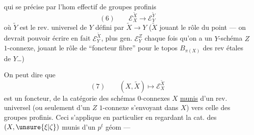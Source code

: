 
qui se précise par l'hom effectif de groupes profinis
\[
(6)\qquad \mathcal E_X^{\widetilde X}\longrightarrow\mathcal E_Y^{\widetilde Y}
\]
où $\widetilde Y$ est le rev. universel de $Y$ défini par $\widetilde X\longrightarrow Y$ ($\widetilde X$ jouant le rôle du point --- on devrait pouvoir écrire en fait $\mathcal E_Y^{\widetilde X}$, plus gen. $\mathcal E_Y^Z$ chaque fois qu'on a un $Y$-schéma $Z$ $1$-connexe, jouant le rôle de ``foncteur fibre'' pour le topos $B_{\pi(X)}$ des rev étales de $Y$\ldots)


On peut dire que
\[
(7)\qquad (X,\widetilde X)\longmapsto\mathcal E_X^{\widetilde X}
\]
est un foncteur, de la catégorie des schémas $0$-connexes $X$ \uline{munis} d'un rev. universel (ou seulement d'un $Z$ $1$-connexe s'envoyant dans $X$) vers celle des groupes profinis. Ceci s'applique en particulier en regardant la cat. des $(X,\unsure{\xi|\zeta})$ munis d'un $p^t$ géom ---


